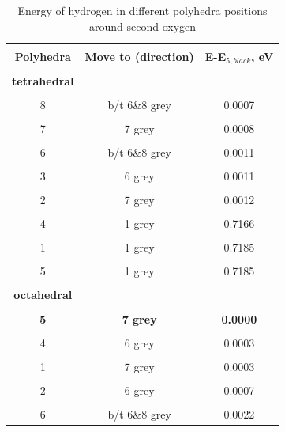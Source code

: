 \documentclass[11pt]{article}
\begin{document}
\begin{table}[H]
\scriptsize{
\caption{Energy of hydrogen in different polyhedra positions around second oxygen}
\label{energy2}
\begin{center}
\begin{tabular}{|c|c|c|}
\hline
& & \\
 \textbf{Polyhedra} & \textbf{Move to (direction)} & \textbf{E-E$_{5,black}$, eV}\\ 
\hline
& & \\
 \textbf{tetrahedral}  &  & \\ 
\hline
& & \\
8 & b/t 6\&8 grey & 0.0007 \\
\hline
& & \\
7 & 7 grey & 0.0008 \\
\hline
& & \\
6 & b/t 6\&8 grey & 0.0011 \\
\hline
& & \\
3 & 6 grey & 0.0011 \\
\hline
& &\\
2 & 7 grey & 0.0012 \\
\hline
& & \\
4 & 1 grey & 0.7166 \\
\hline
& &\\
1 & 1 grey & 0.7185 \\
\hline
& &\\
5 & 1 grey & 0.7185 \\
\hline
& &\\
\textbf{octahedral} & & \\
\hline
& & \\
\textbf{5} & \textbf{7 grey} & \textbf{0.0000} \\
\hline
& &  \\
4 & 6 grey & 0.0003 \\
\hline
& & \\
1 & 7 grey & 0.0003 \\
\hline
& & \\
2 & 6 grey & 0.0007 \\
\hline
& & \\
6 & b/t 6\&8 grey & 0.0022 \\
\hline
\end{tabular}
\end{center}
}
\end{table}
\end{document}
